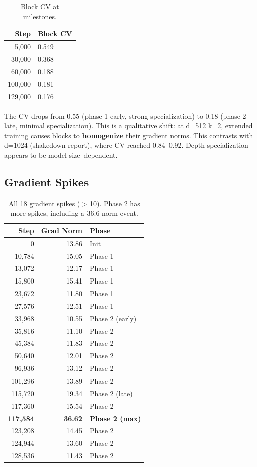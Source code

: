 \documentclass[11pt,a4paper]{article}
\begin{document}
\begin{table}[H]
\centering
\caption{Block CV at milestones.}
\begin{tabular}{rl}
\toprule
\textbf{Step} & \textbf{Block CV} \\
\midrule
5,000 & 0.549 \\
30,000 & 0.368 \\
60,000 & 0.188 \\
100,000 & 0.181 \\
129,000 & 0.176 \\
\bottomrule
\end{tabular}
\end{table}

\noindent The CV drops from 0.55 (phase 1 early, strong specialization) to 0.18 (phase 2 late, minimal
specialization). This is a qualitative shift: at d=512 k=2, extended training causes blocks to
\textbf{homogenize} their gradient norms. This contrasts with d=1024 (shakedown report), where CV
reached 0.84--0.92. Depth specialization appears to be model-size--dependent.

\subsection{Gradient Spikes}

\begin{table}[H]
\centering
\caption{All 18 gradient spikes ($>$10). Phase 2 has more spikes, including a 36.6-norm event.}
\small
\begin{tabular}{rrl}
\toprule
\textbf{Step} & \textbf{Grad Norm} & \textbf{Phase} \\
\midrule
0      & 13.86 & Init \\
10,784 & 15.05 & Phase 1 \\
13,072 & 12.17 & Phase 1 \\
15,800 & 15.41 & Phase 1 \\
23,672 & 11.80 & Phase 1 \\
27,576 & 12.51 & Phase 1 \\
\midrule
33,968 & 10.55 & Phase 2 (early) \\
35,816 & 11.10 & Phase 2 \\
45,384 & 11.83 & Phase 2 \\
50,640 & 12.01 & Phase 2 \\
96,936 & 13.12 & Phase 2 \\
101,296 & 13.89 & Phase 2 \\
115,720 & 19.34 & Phase 2 (late) \\
117,360 & 15.54 & Phase 2 \\
\textbf{117,584} & \textbf{36.62} & \textbf{Phase 2 (max)} \\
123,208 & 14.45 & Phase 2 \\
124,944 & 13.60 & Phase 2 \\
128,536 & 11.43 & Phase 2 \\
\bottomrule
\end{tabular}
\end{table}
\end{document}
